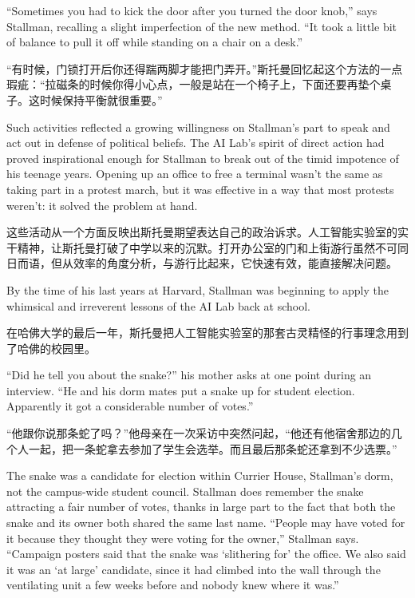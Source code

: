 \ifdefined\eng
``Sometimes you had to kick the door after you turned the door knob,'' says Stallman, recalling a slight imperfection of the new method. ``It took a little bit of balance to pull it off while standing on a chair on a desk.''
\fi

\ifdefined\chs
``有时候，门锁打开后你还得踹两脚才能把门弄开。''斯托曼回忆起这个方法的一点瑕疵：``拉磁条的时候你得小心点，一般是站在一个椅子上，下面还要再垫个桌子。这时候保持平衡就很重要。''
\fi

\ifdefined\eng
Such activities reflected a growing willingness on Stallman's part to speak and act out in defense of political beliefs. The AI Lab's spirit of direct action had proved inspirational enough for Stallman to break out of the timid impotence of his teenage years. Opening up an office to free a terminal wasn't the same as taking part in a protest march, but it was effective in a way that most protests weren't: it solved the problem at hand.
\fi

\ifdefined\chs
这些活动从一个方面反映出斯托曼期望表达自己的政治诉求。人工智能实验室的实干精神，让斯托曼打破了中学以来的沉默。打开办公室的门和上街游行虽然不可同日而语，但从效率的角度分析，与游行比起来，它快速有效，能直接解决问题。
\fi

\ifdefined\eng
By the time of his last years at Harvard, Stallman was beginning to apply the whimsical and irreverent lessons of the AI Lab back at school.
\fi

\ifdefined\chs
在哈佛大学的最后一年，斯托曼把人工智能实验室的那套古灵精怪的行事理念用到了哈佛的校园里。
\fi

\ifdefined\eng
``Did he tell you about the snake?'' his mother asks at one point during an interview. ``He and his dorm mates put a snake up for student election. Apparently it got a considerable number of votes.''
\fi

\ifdefined\chs
``他跟你说那条蛇了吗？''他母亲在一次采访中突然问起，``他还有他宿舍那边的几个人一起，把一条蛇拿去参加了学生会选举。而且最后那条蛇还拿到不少选票。''
\fi

\ifdefined\eng
The snake was a candidate for election within Currier House, Stallman's dorm, not the campus-wide student council. Stallman does remember the snake attracting a fair number of votes, thanks in large part to the fact that both the snake and its owner both shared the same last name. ``People may have voted for it because they thought they were voting for the owner,'' Stallman says. ``Campaign posters said that the snake was `slithering for' the office. We also said it was an `at large' candidate, since it had climbed into the wall through the ventilating unit a few weeks before and nobody knew where it was.''
\fi

